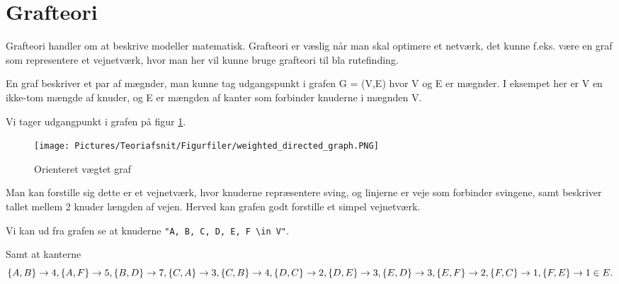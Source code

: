 \section{Grafteori}

Grafteori handler om at beskrive  modeller matematisk. Grafteori er væslig når man skal optimere et netværk, det kunne f.eks. være en graf som representere et vejnetværk, hvor man her vil kunne bruge grafteori til bla rutefinding.  

En graf beskriver et par af mægnder, man kunne tag udgangspunkt i grafen G = (V,E) hvor V og E er mægnder. I eksempet her er V en ikke-tom mængde af knuder, og E er mængden af kanter som forbinder knuderne i mægnden V. 

\vspace{5mm}

Vi tager udgangpunkt i grafen på figur \ref{fig:weighted-directed-graph}.

\begin{figure}[H]
\begin{adjustbox}{width=0.5\textwidth,center=\textwidth}
\centering
\texttt{[image: Pictures/Teoriafsnit/Figurfiler/weighted\_directed\_graph.PNG]}
\end{adjustbox}
\caption{Orienteret vægtet graf}
\label{fig:weighted-directed-graph}
\end{figure}

\vspace{5mm}

Man kan forstille sig dette er et vejnetværk, hvor knuderne repræsentere sving, og linjerne er veje som forbinder svingene, samt beskriver tallet mellem 2 knuder længden af vejen. Herved kan grafen godt forstille et simpel vejnetværk.

\vspace{5mm}

Vi kan ud fra grafen se at knuderne \verb!"A, B, C, D, E, F \in V"!. 

\vspace{5mm}

Samt at kanterne
\begin{equation}\label{grafteori}
\{A,B\} \rightarrow 4, \{A,F\} \rightarrow 5, \{B,D\} \rightarrow 7, \{C,A\} \rightarrow 3, \{C,B\} \rightarrow 4 , \{D,C\} \rightarrow 2, \{D,E\}\\ \rightarrow 3 , \{E,D\} \rightarrow 3, \{E,F\} \rightarrow 2, \{F,C\} \rightarrow 1 , \{F,E\} \rightarrow 1 \in  E.
\end{equation}

\vspace{5mm}

